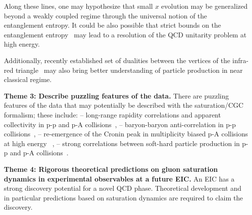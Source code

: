 Along these lines, one may hypothesize that small $x$ evolution may be generalized beyond 
a weakly coupled regime through the universal notion of the entanglement entropy. 
It could be also possible  that strict bounds on the entanglement entropy~\cite{Holzhey:1994we,Calabrese:2005zw}
may lead 
to a resolution of the QCD unitarity problem at high energy. 

Additionally, recently established set of dualities between the vertices 
of the infra-red triangle~\cite{Strominger:2017zoo,Pate:2017vwa,Ball:2018prg} may also bring better understanding of particle production in near classical regime. 

\vspace{0.5em}



\noindent

{\bf Theme 3:  Describe puzzling features of the data. }
There are puzzling features of the data that may potentially be described 
with the saturation/CGC formalism; these include: 
-- long-range rapidity correlations and apparent collectivity in p-p and p-A 
collisions~\cite{Khachatryan:2010nk,Aad:2010ac,Aaij:2014pza,ALICE:2017pcy},  
-- baryon-baryon anti-correlation in p-p collisions~\cite{Adam:2016iwf}, 
-- re-emergence of the Cronin peak in multiplicity biased p-A collisions at high energy~\cite{ALICE:2012mj} , 
-- strong correlations between soft-hard particle production in p-p and p-A collisions~\cite{ATLAS:2014cpa,Aad:2015ziq}. 


\vspace{0.5em}

\noindent

{\bf Theme 4:  Rigorous theoretical predictions 
on gluon saturation dynamics in experimental observables at a future EIC.}
An EIC has a strong discovery potential 
for a novel QCD phase. Theoretical development and in particular 
predictions based on saturation dynamics are required to claim  the discovery. 

\vspace{2em}

